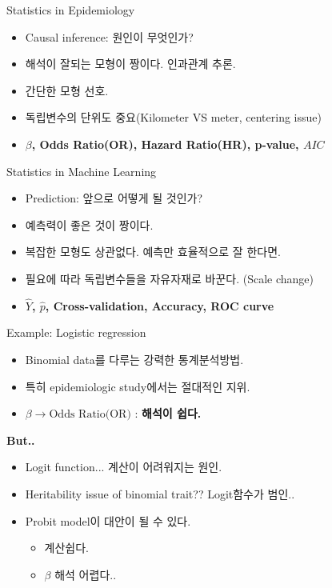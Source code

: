 \documentclass{beamer}
\begin{document}
\begin{frame}{Statistics in Epidemiology}
\begin{itemize}
\item Causal inference: 원인이 무엇인가? 
\item 해석이 잘되는 모형이 짱이다. 인과관계 추론. 
\item 간단한 모형 선호. 
\item 독립변수의 단위도 중요(Kilometer VS meter, centering issue)
\item \bf{$\beta$}, \textbf{Odds Ratio(OR), Hazard Ratio(HR), p-value}, \bf{$AIC$}
\end{itemize}
\end{frame}

\begin{frame}{Statistics in Machine Learning}
\begin{itemize}
\item Prediction: 앞으로 어떻게 될 것인가? 
\item 예측력이 좋은 것이 짱이다.  
\item 복잡한 모형도 상관없다. 예측만 효율적으로 잘 한다면. 
\item 필요에 따라 독립변수들을 자유자재로 바꾼다. (Scale change)
\item \bf{$\hat{Y}$}, \bf{$\hat{p}$}, \textbf{Cross-validation, Accuracy, ROC curve}
\end{itemize}
\end{frame}

\begin{frame}{Example: Logistic regression}
\begin{itemize}
\item Binomial data를 다루는 강력한 통계분석방법. 
\item 특히 epidemiologic study에서는 절대적인 지위.
\item $\beta \rightarrow \text{Odds Ratio(OR)}$ : \textbf{해석이 쉽다.} 
\end{itemize}
\textbf{But..}
\begin{itemize}
\item Logit function... 계산이 어려워지는 원인.
\item Heritability issue of binomial trait?? Logit함수가 범인..
\item Probit model이 대안이 될 수 있다. 
 \begin{itemize}
 \item 계산쉽다. 
 \item $\beta$ 해석 어렵다..
 \end{itemize}
\end{itemize}
\end{frame}
\end{document}
